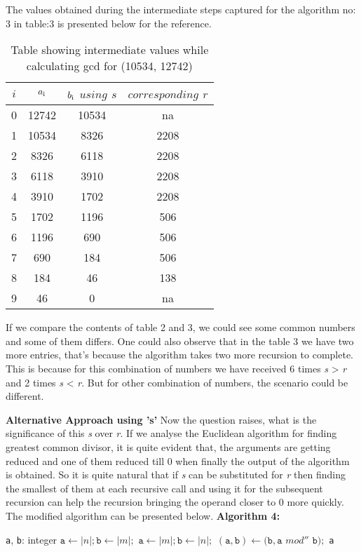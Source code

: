 \documentclass[conference,compsoc]{IEEEtran}
\newcommand{\var}[1]{\textit{#1}}
\newcommand{\progvar}[1]{\texttt{#1}}
\begin{document}
The values obtained during the intermediate steps captured for the algorithm no: 3 in table:3 is presented below for the reference.
\begin{table}[!htbp]
\caption{Table showing intermediate values while calculating gcd for (10534, 12742)}
\label{table:3}
\centering
	\begin{tabular}{c | c | c | c}
		\hline
		$i$ & $a\textsubscript{i}$ & $b\textsubscript{i} $ $using $ $s$ & $corresponding $ $r$\\ [0.5ex] 
		\hline
		0 & 12742 & 10534 & na  \\ 
		1 & 10534 & 8326  & 2208\\  
		2 & 8326  & 6118  & 2208\\
		3 & 6118  & 3910  & 2208\\
		4 & 3910   & 1702 & 2208\\
		5 & 1702   & 1196 & 506\\
		6 & 1196   & 690  & 506\\
		7 & 690    & 184  & 506\\
		8 & 184    & 46   & 138\\
		9 & 46     & 0    & na
	\end{tabular}
\end{table}

If we compare the contents of table 2 and 3, we could see some common numbers and some of them differs. One could also observe that in the table 3 we have two more entries, that's because the algorithm takes two more recursion to complete. This is because for 
this combination of numbers we have received 6 times \var{s} > \var{r} and 2 times 
\var{s} < \var{r}. But for other combination of numbers, the scenario could be different.

\textbf{Alternative Approach using 's'}
Now the question raises, what is the significance of this \var{s} over \var{r}.
If we analyse the Euclidean algorithm for finding greatest common divisor, it is quite evident that, the arguments are getting reduced and one of them reduced till 0 when finally the output of the algorithm is obtained. So it is quite natural that if \var{s} can be substituted  for \var{r} then finding the smallest of them at each recursive call and using it for the subsequent recursion can help the recursion bringing the operand closer to 0 more quickly. The modified algorithm can be presented below.
\newline \textbf{Algorithm 4:}
\begin{algorithmic}[1]
\STATE \progvar{a}, \progvar{b}: integer
	\STATE $\progvar{a} \gets |n|; \progvar{b} \gets |m|;$
\ELSE
	\STATE $\progvar{a} \gets |m|; \progvar{b} \gets |n|;$
\ENDIF
\WHILE{$\progvar{b} > 0$ } 
	\STATE $(\progvar{a}, \progvar{b}) \leftarrow (\progvar{b}, \progvar{a}  $ $mod'' $ $\progvar{b});$
\ENDWHILE
\RETURN \progvar{a}
\end {algorithmic}
\end{document}
